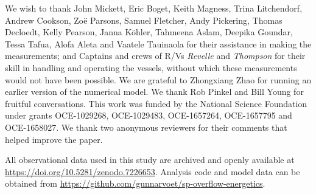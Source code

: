 \documentclass{ametsocV6.1}
\begin{document}
\clearpage

\acknowledgments
We wish to thank John Mickett, Eric Boget, Keith Magness, Trina Litchendorf, Andrew Cookson, Zo\"{e} Parsons, Samuel Fletcher, Andy Pickering, Thomas Decloedt, Kelly Pearson, Janna K\"ohler, Tahmeena Aslam, Deepika Goundar, Tessa Tafua, Alofa Aleta and Vaatele Tauinaola for their assistance in making the measurements; and Captains and crews of R/Vs \emph{Revelle} and \emph{Thompson} for their skill in handling and operating the vessels, without which these measurements would not have been possible.
We are grateful to Zhongxiang Zhao for running an earlier version of the numerical model.
We thank Rob Pinkel and Bill Young for fruitful conversations.
This work was funded by the National Science Foundation under grants OCE-1029268, OCE-1029483, OCE-1657264, OCE-1657795 and OCE-1658027.
We thank two anonymous reviewers for their comments that helped improve the paper.

\datastatement
All observational data used in this study are archived and openly available at \url{https://doi.org/10.5281/zenodo.7226653}. Analysis code and model data can be obtained from \url{https://github.com/gunnarvoet/sp-overflow-energetics}.


\appendix[A]
\end{document}
